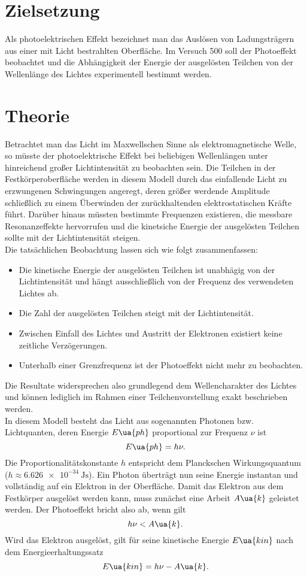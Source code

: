 \setcounter{page}{1}
\section*{Zielsetzung}
Als photoelektrischen Effekt bezeichnet man das Auslösen von Ladungsträgern aus einer
mit Licht bestrahlten Oberfläche. Im Versuch 500 soll der Photoeffekt beobachtet und die
Abhängigkeit der Energie der ausgelösten Teilchen von der Wellenlänge des Lichtes experimentell
bestimmt werden.
\section{Theorie}
Betrachtet man das Licht im Maxwellschen Sinne als elektromagnetische Welle, so müsste
der photoelektrische Effekt bei beliebigen Wellenlängen unter hinreichend großer
Lichtintensität zu beobachten sein. Die Teilchen in der Festkörperoberfläche werden in diesem
Modell durch das einfallende Licht zu erzwungenen Schwingungen angeregt, deren größer werdende
Amplitude schließlich zu einem Überwinden der zurückhaltenden elektrostatischen Kräfte führt.
Darüber hinaus müssten bestimmte Frequenzen existieren, die messbare Resonanzeffekte hervorrufen und die kinetsiche
Energie der ausgelösten Teilchen sollte mit der Lichtintensität steigen.\\
Die tatsächlichen Beobachtung lassen sich wie folgt zusammenfassen:
\begin{itemize}
  \item Die kinetische Energie der ausgelösten Teilchen ist unabhägig von der Lichtintensität und
  hängt ausschließlich von der Frequenz des verwendeten Lichtes ab.
  \item Die Zahl der ausgelösten Teilchen steigt mit der Lichtintensität.
  \item Zwischen Einfall des Lichtes und Austritt der Elektronen existiert keine zeitliche Verzögerungen.
  \item Unterhalb einer Grenzfrequenz ist der Photoeffekt nicht mehr zu beobachten.
\end{itemize}
Die Resultate widersprechen also grundlegend dem Wellencharakter des Lichtes und können lediglich im
Rahmen einer Teilchenvorstellung exakt beschrieben werden.\\
In diesem Modell besteht das Licht aus sogenannten Photonen bzw. Lichtquanten, deren Energie $E\ua{ph}$ proportional
zur Frequenz $\nu$ ist
\begin{equation}
E\ua{ph} = h \nu.
\end{equation}
Die Proportionalitätskonstante $h$ entspricht dem Planckschen Wirkungsquantum ($h \approx \SI{6.626e-34}{\joule\second}$). Ein Photon
überträgt nun seine Energie instantan und vollständig auf ein Elektron in der Oberfläche. Damit das Elektron
aus dem Festkörper ausgelöst werden kann, muss zunächst eine Arbeit $A\ua{k}$ geleistet werden. Der Photoeffekt bricht
also ab, wenn gilt
\begin{equation}
  h\nu < A\ua{k}.
\end{equation}
Wird das Elektron ausgelöst, gilt für seine kinetische Energie $E\ua{kin}$ nach dem Energieerhaltungssatz
\begin{equation}
  E\ua{kin} = h\nu - A\ua{k}.
\end{equation}

